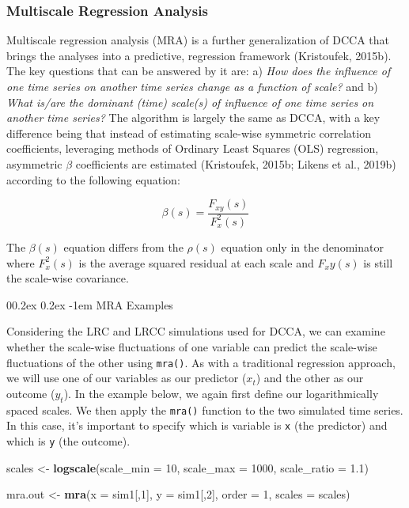 \documentclass[
  man]{apa6}
\makeatletter
\newenvironment{Shaded}{\begin{snugshade}}{\end{snugshade}}
\newcommand{\AttributeTok}[1]{\textcolor[rgb]{0.13,0.29,0.53}{#1}}
\newcommand{\DecValTok}[1]{\textcolor[rgb]{0.00,0.00,0.81}{#1}}
\newcommand{\FloatTok}[1]{\textcolor[rgb]{0.00,0.00,0.81}{#1}}
\newcommand{\FunctionTok}[1]{\textcolor[rgb]{0.13,0.29,0.53}{\textbf{#1}}}
\newcommand{\NormalTok}[1]{#1}
\newcommand{\OtherTok}[1]{\textcolor[rgb]{0.56,0.35,0.01}{#1}}
\let\oldparagraph\paragraph
\renewcommand{\paragraph}[1]{\oldparagraph{#1}\mbox{}}
\renewcommand{\paragraph}{\@startsection{paragraph}{4}{\parindent}%
  {0\baselineskip \@plus 0.2ex \@minus 0.2ex}%
  {-1em}%
  {\normalfont\normalsize\bfseries\itshape\typesectitle}}
\makeatother
\begin{document}
\hypertarget{multiscale-regression-analysis}{%
\subsubsection{Multiscale Regression Analysis}\label{multiscale-regression-analysis}}

Multiscale regression analysis (MRA) is a further generalization of DCCA
that brings the analyses into a predictive, regression framework
(Kristoufek, 2015b). The key questions that can be answered by it are: a)
\emph{How does the influence of one time series on another time series change
as a function of scale?} and b) \emph{What is/are the dominant (time)
scale(s) of influence of one time series on another time series?} The
algorithm is largely the same as DCCA, with a key difference being that
instead of estimating scale-wise symmetric correlation coefficients,
leveraging methods of Ordinary Least Squares (OLS) regression,
asymmetric \(\beta\) coefficients are estimated (Kristoufek, 2015b; Likens et al., 2019b) according to the following equation:

\[
\beta(s)=\frac{F_{xy}(s)}{F^2_x(s)}
\]

The \(\beta(s)\) equation differs from the \(\rho(s)\) equation only in the
denominator where \(F^2_x(s)\) is the average squared residual at each
scale and \(F_xy(s)\) is still the scale-wise covariance.

\hypertarget{mra-examples}{%
\paragraph{MRA Examples}\label{mra-examples}}

Considering the LRC and LRCC simulations used for DCCA, we can examine
whether the scale-wise fluctuations of one variable can predict the
scale-wise fluctuations of the other using \texttt{mra()}. As with a
traditional regression approach, we will use one of our variables as our
predictor (\(x_t\)) and the other as our outcome (\(y_t\)). In the example
below, we again first define our logarithmically spaced scales. We then
apply the \texttt{mra()} function to the two simulated time series. In this
case, it's important to specify which is variable is \texttt{x} (the predictor)
and which is \texttt{y} (the outcome).

\begin{Shaded}
\begin{Highlighting}[]
\NormalTok{scales }\OtherTok{\textless{}{-}} \FunctionTok{logscale}\NormalTok{(}\AttributeTok{scale\_min =} \DecValTok{10}\NormalTok{, }\AttributeTok{scale\_max =} \DecValTok{1000}\NormalTok{, }\AttributeTok{scale\_ratio =} \FloatTok{1.1}\NormalTok{)}

\NormalTok{mra.out }\OtherTok{\textless{}{-}} \FunctionTok{mra}\NormalTok{(}\AttributeTok{x =}\NormalTok{ sim1[,}\DecValTok{1}\NormalTok{], }\AttributeTok{y =}\NormalTok{ sim1[,}\DecValTok{2}\NormalTok{], }\AttributeTok{order =} \DecValTok{1}\NormalTok{, }\AttributeTok{scales =}\NormalTok{ scales)}
\end{Highlighting}
\end{Shaded}
\end{document}
